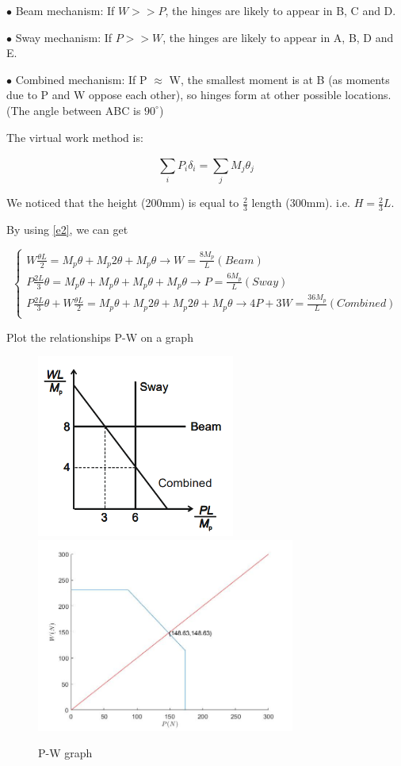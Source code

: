$\bullet$ Beam mechanism: If $W>>P$, the hinges are likely to appear in B, C and D.



$\bullet$ Sway mechanism: If $P>>W$, the hinges are likely to appear in A, B, D and E.




$\bullet$ Combined mechanism: If P $\approx$ W, the smallest moment
is at B (as moments due to P
and W oppose each other), so
hinges form at other possible
locations. (The angle between ABC is $90^\circ$)

The virtual work method is: 

\begin{equation}
    \sum_i^{}{P_i\delta_i}=\sum_j^{}{M_j\theta_j}
    \label{e2}
\end{equation}

We noticed that the height (200mm) is equal to $\frac{2}{3}$ length (300mm). i.e. $H=\frac{2}{3}L$.

By using \autoref{e2}, we can get

$$
\left\{ \begin{array}{l}
	W\frac{\theta L}{2}=M_p\theta+M_p2\theta+M_p\theta \rightarrow W=\frac{8M_p}{L} (Beam)\\
	P\frac{2L}{3}\theta=M_p\theta+M_p\theta+M_p\theta+M_p\theta \rightarrow P=\frac{6M_p}{L} (Sway)\\
	P\frac{2L}{3}\theta+W\frac{\theta L}{2}=M_p\theta+M_p2\theta+M_p2\theta+M_p\theta \rightarrow 4P+3W=\frac{36M_p}{L} (Combined)\\
\end{array} \right. 
$$

Plot the relationships P-W on a graph

\begin{figure}[htbp]
    \centering
    \includegraphics[width=6.5cm]{./fig/14.png}
    \includegraphics[width=8.5cm]{./fig/15.jpg}
    \caption{P-W graph}
    \label{f2}
\end{figure}




